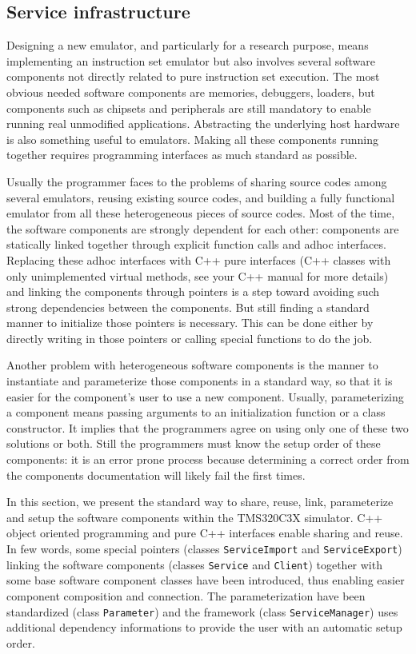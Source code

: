 \subsection{Service infrastructure}
\label{tms320c3x_service_infrastructure}

Designing a new emulator, and particularly for a research purpose, means implementing an instruction set emulator but also involves several software components not directly related to pure instruction set execution.
The most obvious needed software components are memories, debuggers, loaders, but components such as chipsets and peripherals are still mandatory to enable running real unmodified applications.
Abstracting the underlying host hardware is also something useful to emulators.
Making all these components running together requires programming interfaces as much standard as possible.

Usually the programmer faces to the problems of sharing source codes among several emulators, reusing existing source codes, and building a fully functional emulator from all these heterogeneous pieces of source codes.
Most of the time, the software components are strongly dependent for each other: components are statically linked together through explicit function calls and adhoc interfaces.
Replacing these adhoc interfaces with C++ pure interfaces (C++ classes with only unimplemented virtual methods, see your C++ manual for more details) and linking the components through pointers is a step toward avoiding such strong dependencies between the components. But still finding a standard manner to initialize those pointers is necessary. This can be done either by directly writing in those pointers or calling special functions to do the job.

Another problem with heterogeneous software components is the manner to instantiate and parameterize those components in a standard way, so that it is easier for the component's user to use a new component.
Usually, parameterizing a component means passing arguments to an initialization function or a class constructor. It implies that the programmers agree on using only one of these two solutions or both.
Still the programmers must know the setup order of these components: it is an error prone process because determining a correct order from the components documentation will likely fail the first times.

In this section, we present the standard way to share, reuse, link, parameterize and setup the software components within the TMS320C3X simulator.
C++ object oriented programming and pure C++ interfaces enable sharing and reuse.
In few words, some special pointers (classes \texttt{ServiceImport} and \texttt{ServiceExport}) linking the software components (classes \texttt{Service} and \texttt{Client}) together with some base software component classes have been introduced, thus enabling easier component composition and connection.
The parameterization have been standardized (class \texttt{Parameter}) and the framework (class \texttt{ServiceManager}) uses additional dependency informations to provide the user with an automatic setup order.

